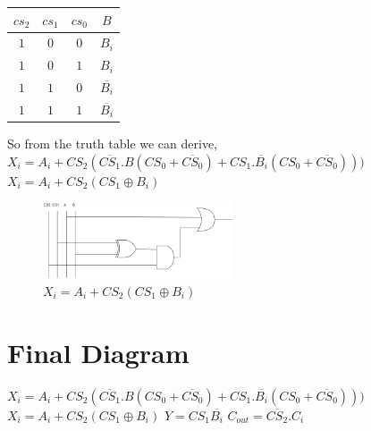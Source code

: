 \documentclass[]{article}
\begin{document}
	\begin{center}
		\begin{tabular}{|c|c|c|c|}
			\hline
			$cs_2$ & $cs_1$ & $cs_0$ & $B$ \\
			\hline
			
			\hline
			$1$ & $0$ & $0$ & $B_i$ \\
			\hline
			
			\hline
			$1$ & $0$ & $1$ & $B_i$ \\
			\hline
			
			\hline
			$1$ & $1$ & $0$ & $\overline{B_i}$ \\
			\hline
			
			\hline
			$1$ & $1$ & $1$ & $\overline{B_i}$ \\
			\hline
		\end{tabular}
	\end{center}
	So from the truth table we can derive, \newline
	$X_i=A_i+CS_2(\overline{CS_1}.B(CS_0 + \overline{CS_0})+CS_1.\overline{B_i}(CS_0 + \overline{CS_0})) )$ \newline
		$X_i=A_i+CS_2(CS_1\oplus B_i)$ \newline
	
	\begin{figure}[h]
		\centering
		\includegraphics[width = 0.5\textwidth]{image/ckt2.png}
		\caption{
				$X_i=A_i+CS_2(CS_1\oplus B_i)$ \newline
		}
		\label{fig:ckt1}
		
	\end{figure}

	\section{Final Diagram}
		$X_i=A_i+CS_2(\overline{CS_1}.B(CS_0 + \overline{CS_0})+CS_1.\overline{B_i}(CS_0 + \overline{CS_0})) )$ \newline
		$X_i=A_i+CS_2(CS_1\oplus B_i)$ \newline
	$Y=CS_1\overline{B_i}$\newline
	$C_{out}=\overline{CS_2}.C_i$ 
	
	
\end{document}
